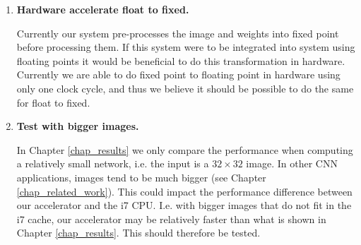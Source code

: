 \begin{enumerate}
	
	
	\item \textbf{Hardware accelerate float to fixed.}
	
	Currently our system pre-processes the image and weights into fixed point before processing them. If this system were to be integrated into system using floating points it would be beneficial to do this transformation in hardware. Currently we are able to do fixed point to floating point in hardware using only one clock cycle, and thus we believe it should be possible to do the same for float to fixed. 

  \item \textbf{Test with bigger images.}

   In Chapter \ref{chap_results} we only compare the performance when computing a relatively small network, i.e. the input is a $ 32 \times 32 $ image. In other CNN applications, images tend to be much bigger (see Chapter \ref{chap_related_work}). This could impact the performance difference between our accelerator and the i7 CPU. I.e. with bigger images that do not fit in the i7 cache, our accelerator may be relatively faster than what is shown in Chapter \ref{chap_results}. This should therefore be tested.
	
\end{enumerate}
